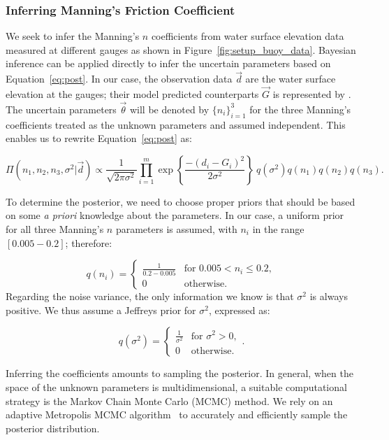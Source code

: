 \subsubsection{Inferring Manning's Friction Coefficient}
\label{sec:infmanning}
 
We seek to infer the Manning's $n$ coefficients from water surface elevation
data measured at different gauges as shown in Figure~\ref{fig:setup_buoy_data}.
Bayesian inference can be applied directly to infer the uncertain parameters
based on Equation~\eqref{eq:post}. In our case, the observation data $\vec d$ 
are the water surface elevation at the gauges;
their model predicted counterparts $\vec G$ is represented by \geoclaw.
The uncertain parameters $\vec \theta$ will be denoted by $\{n_i\}_{i=1}^3$ for the
three Manning's coefficients treated as the unknown parameters and assumed independent. 
This enables us to rewrite Equation~\eqref{eq:post} as:

\begin{equation} 
\Pi(n_1,n_2,n_3,\sigma^2 | \vec d) 
\propto \frac{1}{\sqrt{2 \pi \sigma^2}} 
 \prod_{i=1}^m  
\exp \left\lbrace \frac{-(d_i - G_i)^2}{2 \sigma^2} \right\rbrace
\ q(\sigma^2)q(n_1)q(n_2) q(n_3).
\label{eq:post_coef}
\end{equation}

To determine the posterior, we need to choose proper priors that should be based 
on some \emph{a priori} knowledge about the parameters. In our case, a uniform
prior for all three Manning's $n$ parameters is assumed, with $n_i$ in the range  $[0.005 - 0.2]$; therefore:

\begin{equation} 
q(n_i) = \begin{cases}
		\displaystyle \frac{1}{0.2-0.005} &\text{for~} 0.005 <  n_i \leq 0.2 ,  \\
		0 &\text{otherwise}.
\end{cases}
\end{equation}
Regarding the noise variance, the only information we know 
is that $\sigma^2$ is always positive.
We thus assume a Jeffreys prior \citep{sivia} for $\sigma^2$, expressed as:

\begin{equation} 
q(\sigma^2) =  \begin{cases}
		\displaystyle \frac{1}{\sigma^2} &\text{for~} \sigma^2 > 0,  \\
		0 &\text{otherwise}. 
		\end{cases}.
\label{eq:var_pr}
\end{equation}

Inferring the coefficients amounts to 
sampling the posterior. In general, when the space of the unknown 
parameters is multidimensional, a suitable computational strategy is 
the Markov Chain Monte  Carlo (MCMC) method. 
We rely on an adaptive Metropolis MCMC algorithm~\citep{Gareth2009,Haario2001} to
accurately and efficiently sample the posterior distribution.



